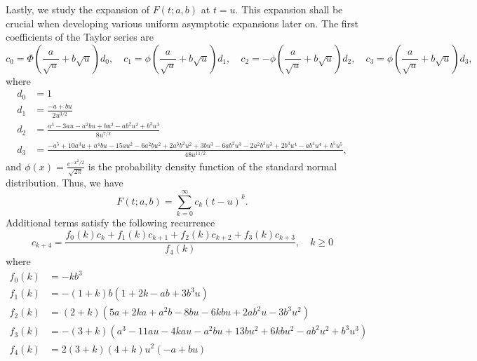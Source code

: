 \documentclass[10pt,a4paper,oneside]{article}
\numberwithin{equation}{section}
\begin{document}
\begin{appendices}
Lastly, we study the expansion of $F(t;a,b)$ at $t=u$. This expansion shall be crucial when developing various uniform asymptotic expansions later on. The first coefficients of the Taylor series are
\begin{equation*}
c_0 = \Phi\left(\frac{a}{\sqrt{u}} + b\sqrt{u}\right)d_0,\quad c_1 = \phi\left(\frac{a}{\sqrt{u}} + b\sqrt{u}\right) d_1, \quad c_2 = -\phi\left(\frac{a}{\sqrt{u}} + b\sqrt{u}\right) d_2, \quad
c_3 = \phi\left(\frac{a}{\sqrt{u}} + b\sqrt{u}\right) d_3,
\end{equation*}
where
\begin{align*}
d_0 &= 1\\
d_1 &= \frac{-a + bu}{2u^{3/2}}\\
d_2 &=\frac{a^3 -3au -a^2 bu + bu^2 -ab^2 u^2 + b^3u^3}{8 u^{7/2}}\\
d_3 &= \frac{-a^5 +10a^3u + a^4bu -15au^2 - 6a^2bu^2 + 2a^3 b^2 u^2 +3bu^3 -6ab^2u^3 - 2a^2b^3 u^3 + 2b^3 u^4 -ab^4u^4 + b^5 u^5}{48 u^{11/2}},
\end{align*}
and $\phi(x) = \frac{e^{-x^2/2}}{\sqrt{2\pi}}$ is the probability density function of the standard normal distribution. Thus, we have
\begin{equation}\label{phi_expansion_at_u}
F(t; a, b) = \sum_{k=0}^{\infty} c_k (t-u)^k.
\end{equation}
Additional terms satisfy the following recurrence
\begin{equation}
c_{k+4} = \frac{f_0(k) c_k + f_1(k) c_{k+1} + f_2(k) c_{k+2} + f_3(k) c_{k+3}}{f_4(k)}, \quad k \ge 0
\end{equation}
where
\begin{align*}
f_0(k) &= -kb^3\\
f_1(k) &= -(1 + k) b (1 + 2k -ab + 3b^3u)\\
f_2(k) &= (2 + k)(5a + 2ka +a^2b - 8bu - 6kbu +2ab^2u -3b^3u^2)\\
f_3(k) &= -(3 + k)(a^3 - 11au -4kau - a^2bu + 13bu^2 + 6kbu^2 -ab^2u^2 + b^3 u^3)\\
f_4(k) &= 2 (3 + k) (4 + k) u^2 (-a + bu)
\end{align*}


\end{appendices}
\end{document}
